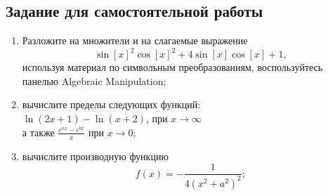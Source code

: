 \newpage
\subsection*{\textbf{Задание для самостоятельной работы}}

\begin{enumerate}
    \item Разложите на множители и на слагаемые выражение
    \[\sin[x]^2 \cos[x]^2+4 \sin[x] \cos[x]+1,\]
    используя материал  по символьным преобразованиям, воспользуйтесь панелью Algebraic Manipulation;
    \begin{figure}[H]
        \renewcommand{\figurename}{Рисунок}
        \label{fig:image_self_1_1}
    \end{figure}
    \item вычислите пределы следующих функций: \\
    $\ln(2x+1)-\ln(x+2)$, при  $x\to\infty$ \\
    а также $\frac{e^{ax}-e^{bx}}{x}$ при $x\to0$;
    \begin{figure}[H]
        \renewcommand{\figurename}{Рисунок}
        \label{fig:image_self_1_2}
    \end{figure}
    \item вычислите производную функцию
    \[f(x) = -\frac{1}{4(x^2+a^2)^2};\]
    \begin{figure}[H]
        \renewcommand{\figurename}{Рисунок}

\end{figure}
\end{enumerate}
